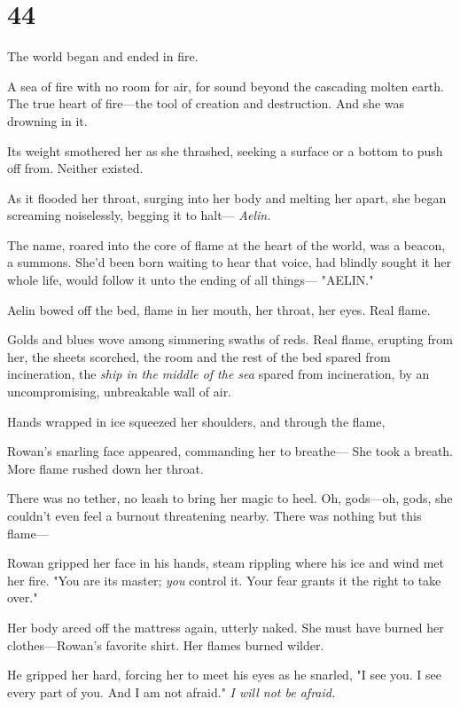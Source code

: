 
\chapter{44}

The world began and ended in fire.

A sea of fire with no room for air, for sound beyond the cascading molten earth. The true heart of fire---the tool of creation and destruction. And she was drowning in it.

Its weight smothered her as she thrashed, seeking a surface or a bottom to push off from. Neither existed.

As it flooded her throat, surging into her body and melting her apart, she began screaming noiselessly, begging it to halt--- \emph{Aelin.}

The name, roared into the core of flame at the heart of the world, was a beacon, a summons. She'd been born waiting to hear that voice, had blindly sought it her whole life, would follow it unto the ending of all things--- "AELIN."

Aelin bowed off the bed, flame in her mouth, her throat, her eyes. Real flame.

Golds and blues wove among simmering swaths of reds. Real flame, erupting from her, the sheets scorched, the room and the rest of the bed spared from incineration, the \emph{ship in the middle of the sea}
spared from incineration, by an uncompromising, unbreakable wall of air.

Hands wrapped in ice squeezed her shoulders, and through the flame,

Rowan's snarling face appeared, commanding her to breathe--- She took a breath. More flame rushed down her throat.

There was no tether, no leash to bring her magic to heel. Oh, gods---oh, gods, she couldn't even feel a burnout threatening nearby. There was nothing but this flame---

Rowan gripped her face in his hands, steam rippling where his ice and wind met her fire. "You are its master; \emph{you} control it. Your fear grants it the right to take over."

Her body arced off the mattress again, utterly naked. She must have burned her clothes---Rowan's favorite shirt. Her flames burned wilder.

He gripped her hard, forcing her to meet his eyes as he snarled, "I see you. I see every part of you. And I am not afraid." \emph{I will not be afraid.}

